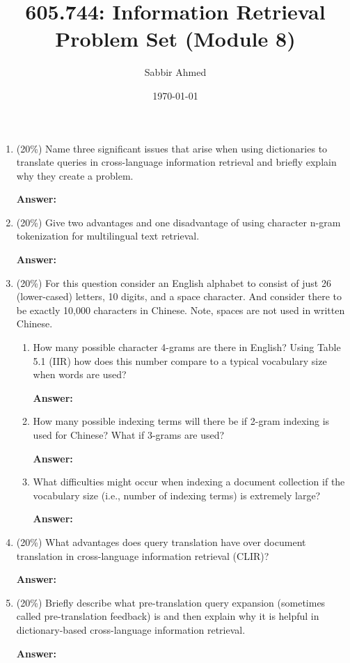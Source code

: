 \documentclass[11pt]{article}
\title{605.744: Information Retrieval \\ Problem Set (Module 8)}
\author{Sabbir Ahmed}
\date{\today}
\begin{document}
\maketitle

    \begin{enumerate}

        \item (20\%) Name three significant issues that arise when using dictionaries to translate queries in cross-language
        information retrieval and briefly explain why they create a problem.

        \textbf{Answer:}

        \item (20\%) Give two advantages and one disadvantage of using character n-gram tokenization for multilingual
        text retrieval.

        \textbf{Answer:}

        \item (20\%) For this question consider an English alphabet to consist of just 26 (lower-cased) letters, 10 digits,
        and a space character. And consider there to be exactly 10,000 characters in Chinese. Note, spaces are
        not used in written Chinese.

        \begin{enumerate}
            \item How many possible character 4-grams are there in English? Using Table 5.1 (IIR) how does this number
            compare to a typical vocabulary size when words are used?

            \textbf{Answer:}

            \item How many possible indexing terms will there be if 2-gram indexing is used for Chinese? What if 3-grams
            are used?

            \textbf{Answer:}

            \item What difficulties might occur when indexing a document collection if the vocabulary size (i.e., number of
            indexing terms) is extremely large?

            \textbf{Answer:}

        \end{enumerate}

        \item (20\%) What advantages does query translation have over document translation in cross-language
        information retrieval (CLIR)?

        \textbf{Answer:}

        \item (20\%) Briefly describe what pre-translation query expansion (sometimes called pre-translation feedback)
        is and then explain why it is helpful in dictionary-based cross-language information retrieval.

        \textbf{Answer:}

    \end{enumerate}
\end{document}
